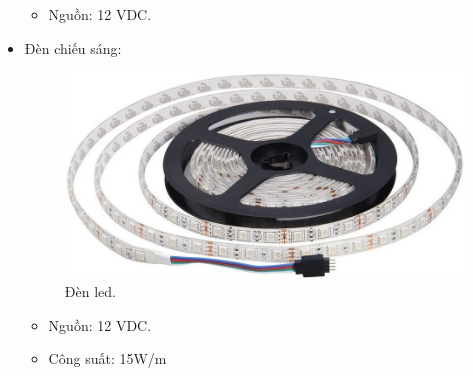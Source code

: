 \documentclass[a4paper,12pt,oneside]{article}
\begin{document}
\begin{itemize}
\begin{itemize}
\item Nguồn: 12 VDC.
\end{itemize}


\item Đèn chiếu sáng:
\begin{figure}[H]
	\centering
	\includegraphics[scale=0.4]{hinh/led.jpg}
	\caption{Đèn led.}
\end{figure}
\begin{itemize}
\item Nguồn: 12 VDC. 
\item Công suất: 15W/m
\end{itemize}

\end{itemize}
\end{document}

